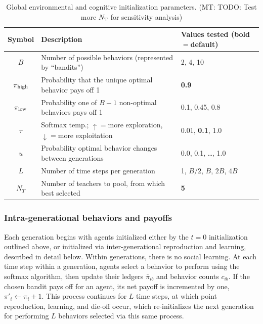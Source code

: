 \documentclass[letterpaper,11.5pt]{scrartcl}
\newcommand{\mt}[1]{{\textcolor{myorange} {({\tiny MT:} #1)}}}
\begin{document}
\vspace{2em}
\begin{table}[h]
    \caption{Global environmental and cognitive initialization parameters.
    \mt{TODO: Test more $N_\text{T}$ for sensitivity analysis}}
    \label{tab:modelParameters}
    \centering %
    \begin{tabular}{cp{2.5in}p{1in}} \toprule

        Symbol & Description & Values tested (bold$=$default) \\ 

        \midrule  

        $B$       & Number of possible behaviors (represented by ``bandits'') 
                  & 2, 4, 10 \\

        $\pi_{\mathrm{high}}$ & Probability that the unique optimal behavior pays off 1 
                & \textbf{0.9} \\

        $\pi_{\mathrm{low}}$ & Probability one of $B - 1$ non-optimal behaviors pays off 1 
                 & 0.1, 0.45, 0.8 \\ 

        $\tau$ & Softmax temp.; $\uparrow=$more exploration, $\downarrow=$more
                    exploitation 
               & 0.01, \textbf{0.1}, 1.0 \\
        
        $u$    & Probability optimal behavior changes between generations 
               & 0.0, 0.1, \ldots, 1.0 \\

        $L$    & Number of time steps per generation & 1, $B/2$, $B$, $2B$, $4B$ \\

        $N_T$    & Number of teachers to pool, from which best selected 
                 & \textbf{5}  \\

            
               
        \bottomrule
        \end{tabular} 
\end{table}


\subsubsection{Intra-generational behaviors and payoffs}

Each generation begins with agents initialized either by the $t=0$ initialization
outlined above, or initialized via inter-generational reproduction and learning,
described in detail below. Within generations, there is no social learning.
At each time step within a generation, agents select a behavior to perform
using the softmax algorithm, then update their ledgers $\bar\pi_{ib}$ and behavior
counts $c_{ib}$. If 
the chosen bandit pays off for an agent, its net payoff is incremented by one,
$\pi'_i \leftarrow \pi_i + 1$. This process continues for $L$ time steps, 
at which point reproduction, learning, and die-off occur, which re-initializes 
the next generation for performing $L$ behaviors selected via this same process.
\end{document}
